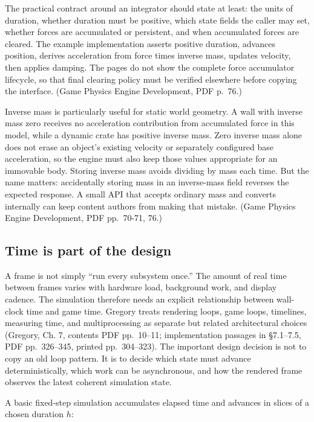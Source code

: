 The practical contract around an integrator should state at least: the units of duration, whether duration must be positive, which state fields the caller may set, whether forces are accumulated or persistent, and when accumulated forces are cleared. The example implementation asserts positive duration, advances position, derives acceleration from force times inverse mass, updates velocity, then applies damping. The pages do not show the complete force accumulator lifecycle, so that final clearing policy must be verified elsewhere before copying the interface. (Game Physics Engine Development, PDF p.~76.)

Inverse mass is particularly useful for static world geometry. A wall with inverse mass zero receives no acceleration contribution from accumulated force in this model, while a dynamic crate has positive inverse mass. Zero inverse mass alone does not erase an object's existing velocity or separately configured base acceleration, so the engine must also keep those values appropriate for an immovable body. Storing inverse mass avoids dividing by mass each time. But the name matters: accidentally storing mass in an inverse-mass field reverses the expected response. A small API that accepts ordinary mass and converts internally can keep content authors from making that mistake. (Game Physics Engine Development, PDF pp.~70-71, 76.)

\subsection{Time is part of the design}\label{05-engine-i-ch014-time-is-part-of-the-design}

A frame is not simply ``run every subsystem once.'' The amount of real time between frames varies with hardware load, background work, and display cadence. The simulation therefore needs an explicit relationship between wall-clock time and game time. Gregory treats rendering loops, game loops, timelines, measuring time, and multiprocessing as separate but related architectural choices (Gregory, Ch. 7, contents PDF pp.~10--11; implementation passages in §7.1--7.5, PDF pp.~326--345, printed pp.~304--323). The important design decision is not to copy an old loop pattern. It is to decide which state must advance deterministically, which work can be asynchronous, and how the rendered frame observes the latest coherent simulation state.

A basic fixed-step simulation accumulates elapsed time and advances in slices of a chosen duration \(h\):

